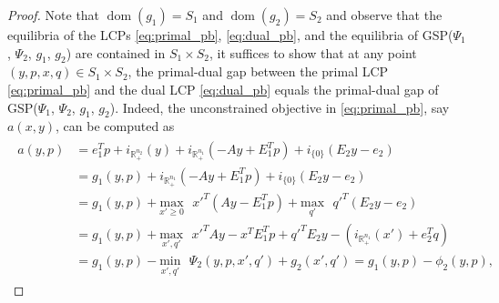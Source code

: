 \documentclass[envcountsame]{llcns2e/llncs}
\DeclareMathOperator{\dom}{dom}
\begin{document}
\begin{proof}
Note that $\dom(g_1) = S_1$ and $\dom(g_2) = S_2$ and observe that the
equilibria of the LCPs \eqref{eq:primal_pb}, \eqref{eq:dual_pb}, and
the equilibria of GSP($\Psi_1$, $\Psi_2$, $g_1$, $g_2$) are contained
in $S_1 \times S_2$, it suffices to show that at any point $(y, p, x,
q) \in S_1 \times S_2$, the primal-dual gap between the primal
LCP \eqref{eq:primal_pb} and the dual LCP \eqref{eq:dual_pb} equals
the primal-dual gap of GSP($\Psi_1$, $\Psi_2$, $g_1$, $g_2$).
Indeed, the unconstrained objective in \eqref{eq:primal_pb}, say
$a(x,y)$, can be computed as
\begin{eqnarray*}
  \begin{aligned}
    a(y,p) &= e_1^Tp +
    i_{\mathbb{R}^{n_2}_+}(y) + i_{\mathbb{R}^{n_1}_+}(-Ay + E_1^Tp) +
    i_{\{0\}}(E_2y - e_2)\\
    &= g_1(y,p) +
    i_{\mathbb{R}^{n_1}_+}(-Ay + E_1^Tp) + i_{\{0\}}(E_2y - e_2)\\
    &= g_1(y,p) + \underset{x' \geq
      0}{\text{max}}\text{ }x'^T(Ay - E_1^Tp) +
    \underset{q'}{\text{max}}\text{ }q'^T(E_2y - e_2)\\
    &= g_1(y,p) + \underset{x',
      q'}{\text{max}}\text{ }x'^TAy - x^TE_1^Tp + q'^TE_2y -
    (i_{\mathbb{R}^{n_1}_+}(x') + e_2^Tq)\\
    &= g_1(y,p)
      - \underset{x',q'}{\text{min}}\text{ }\Psi_2(y, p, x', q') + g_2(x',
      q') = g_1(y,p) -\phi_2(y,p),
  \end{aligned}
  \label{eq:a}
\end{eqnarray*}


\end{proof}
\end{document}
